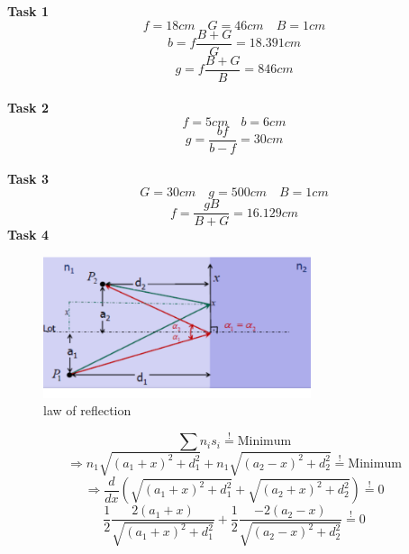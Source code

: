 \documentclass{scrreprt}
\begin{document}
\textbf{Task 1}
\begin{equation}
	f=18cm\quad G=46cm\quad B=1cm
\end{equation}
\begin{equation}
	b=f\frac{B+G}{G}=18.391cm
\end{equation}
\begin{equation}
	g=f\frac{B+G}{B}=846cm
\end{equation}
\\
\textbf{Task 2}
\begin{equation}
	f=5cm\quad b=6cm
\end{equation}
\begin{equation}
	g=\frac{bf}{b-f}=30cm
\end{equation}
\\
\textbf{Task 3}
\begin{equation}
	G=30cm\quad g=500cm\quad B=1cm
\end{equation}
\begin{equation}
	f=\frac{gB}{B+G}=16.129cm
\end{equation}
\textbf{Task 4}
\begin{figure}[H]
	\centering
  \includegraphics[width=0.7\textwidth]{diag/exercises1.pdf}
	\caption{law of reflection}
\end{figure}
\begin{equation}
\sum n_i s_i \stackrel{!}= \mbox{Minimum}
\end{equation}
\begin{equation}
\Rightarrow n_1 \sqrt{(a_1+x)^2+d_1^2}+n_1\sqrt{(a_2-x)^2+d_2^2} \stackrel{!}= \mbox{Minimum}
\end{equation}
\begin{equation}
\Rightarrow \frac{d}{dx} \left(\sqrt{(a_1+x)^2+d_1^2}+\sqrt{(a_2+x)^2+d_2^2}\right) \stackrel{!}= 0
\end{equation}
\begin{equation}
\frac{1}{2} \frac{2(a_1+x)}{\sqrt{(a_1+x)^2+d_1^2}}+\frac{1}{2} \frac{-2(a_2-x)}{\sqrt{(a_2-x)^2+d_2^2}} \stackrel{!}= 0
\end{equation}
\end{document}
